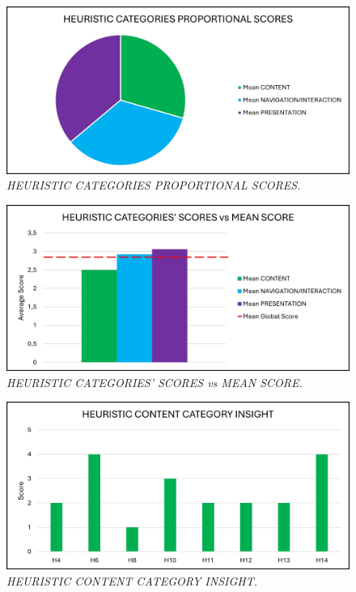 \begin{figure}[h]
	\includegraphics[width=\textwidth]{Visual_illustration_1.jpg}
	\caption{\textit{HEURISTIC CATEGORIES PROPORTIONAL SCORES.}}
	\label{fig:label1}
\end{figure}
\begin{figure}[h]
	\includegraphics[width=\textwidth]{Visual_illustration_2.jpg}
	\caption{\textit{HEURISTIC CATEGORIES' SCORES vs MEAN SCORE.}}
	\label{fig:label2}
\end{figure}
\begin{figure}[h]
	\includegraphics[width=\textwidth]{Visual_illustration_3.jpg}
	\caption{\textit{HEURISTIC CONTENT CATEGORY INSIGHT.}}
	\label{fig:label3}
\end{figure}
